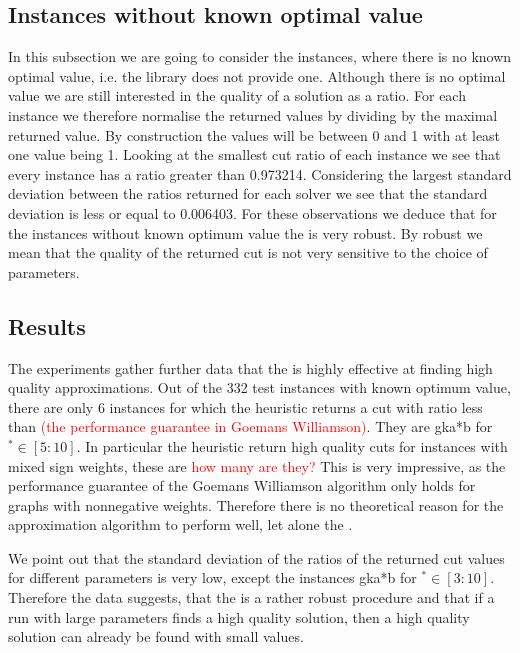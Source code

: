 \documentclass[12pt,a4paper]{article}
\theoremstyle{mythm}
\begin{document}
\subsection{Instances without known optimal value} 
\label{ssec:UnknownOptVal} 
In this subsection we are going to consider the instances, where there is no known optimal value, i.e. the library \cite{MallachLibrary} does not provide one.
Although there is no optimal value we are still interested in the quality of a solution as a ratio.
For each instance we therefore normalise the returned values by dividing by the maximal returned value.
By construction the values will be between 0 and 1 with at least one value being 1.
Looking at the smallest cut ratio of each instance we see that every instance has a ratio greater than 0.973214.
Considering the largest standard deviation between the ratios returned for each solver we see that the standard deviation is less or equal to 0.006403. 
For these observations we deduce that for the instances without known optimum value the \BH is very robust. 
By robust we mean that the quality of the returned cut is not very sensitive to the choice of parameters.

\subsection{Results} 
The experiments gather further data that the \BH is highly effective at finding high quality approximations.
Out of the 332 test instances with known optimum value, there are only 6 instances for which the heuristic returns a cut with ratio less than \GWconst 
\textcolor{red}{(the performance guarantee in Goemans Williamson)}.
They are gka*b for $ ^{ * } \in \left[ 5:10 \right]   $.
In particular the heuristic return high quality cuts for instances with mixed sign weights, these are \textcolor{red}{how many are they?}
This is very impressive, as the performance guarantee of the Goemans Williamson algorithm only holds for graphs with nonnegative weights. Therefore there is no theoretical
reason for the approximation algorithm to perform well, let alone the \BH.

We point out that the standard deviation of the ratios of the returned cut values for different parameters is very low, except the instances gka*b for $ ^{ * } \in \left[ 3:10 \right] $.
Therefore the data suggests, that the \BH is a rather robust procedure and that if a run with large parameters finds a high quality solution, then a high quality solution can already be found with small values.
\end{document}
